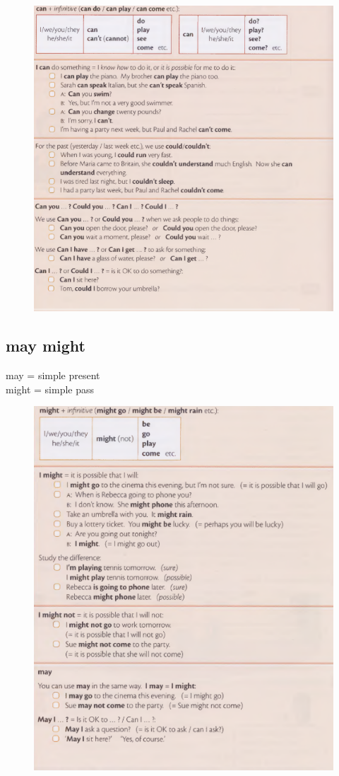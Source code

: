 \documentclass[16pt]{article}
\begin{document}
\begin{figure}[htbp]
  \centering
  \includegraphics[width=1.0\textwidth]{prin.png}
  \caption{}
\end{figure}

\subsection{may  might}
may = simple present\\
might = simple pass
\begin{figure}[htbp]
  \centering
  \includegraphics[width=1.0\textwidth]{might.png}
  \caption{}
\end{figure}
\end{document}
